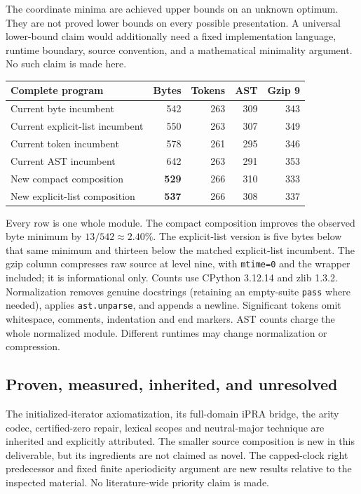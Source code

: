 \documentclass[11pt,letterpaper]{article}
\theoremstyle{definition}\newtheorem{definition}[theorem]{Definition}
\theoremstyle{remark}\newtheorem{remark}[theorem]{Remark}
\begin{document}
The coordinate minima are achieved upper bounds on an unknown optimum.
They are not proved lower bounds on every possible presentation. A universal
lower-bound claim would additionally need a fixed implementation language,
runtime boundary, source convention, and a mathematical minimality argument.
No such claim is made here.

\begin{center}\small
\begin{tabular}{@{}lrrrr@{}}
\toprule
Complete program & Bytes & Tokens & AST & Gzip 9\\\midrule
Current byte incumbent & 542 & 263 & 309 & 343\\
Current explicit-list incumbent & 550 & 263 & 307 & 349\\
Current token incumbent & 578 & 261 & 295 & 346\\
Current AST incumbent & 642 & 263 & 291 & 353\\\midrule
New compact composition & \textbf{529} & 266 & 310 & 333\\
New explicit-list composition & \textbf{537} & 266 & 308 & 337\\
\bottomrule
\end{tabular}
\end{center}

Every row is one whole module. The compact composition improves the observed
byte minimum by $13/542\approx2.40\%$. The explicit-list version is five bytes
below that same minimum and thirteen below the matched explicit-list incumbent.
The gzip column compresses raw source at level nine, with \texttt{mtime=0}
and the wrapper included; it is informational only. Counts use CPython
3.12.14 and zlib 1.3.2. Normalization removes genuine docstrings (retaining an empty-suite
\texttt{pass} where needed), applies
\texttt{ast.unparse}, and appends a newline. Significant tokens omit whitespace,
comments, indentation and end markers. AST counts charge the whole normalized
module. Different runtimes may change normalization or compression.

\subsection{Proven, measured, inherited, and unresolved}

The initialized-iterator axiomatization, its full-domain iPRA bridge, the
arity codec, certified-zero repair, lexical scopes and neutral-major technique
are inherited and explicitly attributed. The smaller source composition is
new in this deliverable, but its ingredients are not claimed as novel.
The capped-clock right predecessor and fixed finite aperiodicity argument
are new results relative to the inspected material.
No literature-wide priority claim is made.
\end{document}
